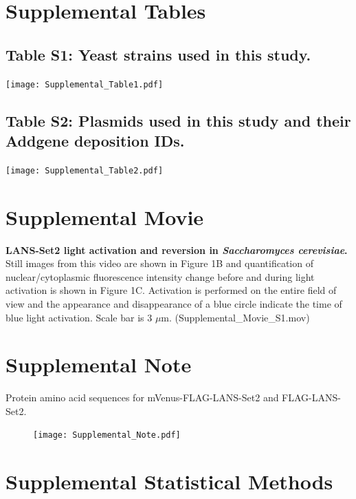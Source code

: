 \documentclass[11pt]{biorxiv}
\begin{document}
\clearpage

\section{Supplemental Tables}
\renewcommand{\thetable}{S\arabic{table}}

\subsection{Table S1: Yeast strains used in this study.}
\begin{table}[ht!]
\center
\texttt{[image: Supplemental\_Table1.pdf]}
\end{table}

\subsection{Table S2: Plasmids used in this study and their Addgene deposition IDs.}
\begin{table}[ht!]
\center
\texttt{[image: Supplemental\_Table2.pdf]}
\end{table}
 
\clearpage

\section{Supplemental Movie}

\noindent \textbf{LANS-Set2 light activation and reversion in \emph{Saccharomyces cerevisiae}.} Still images from this video are shown in Figure 1B and quantification of nuclear/cytoplasmic fluorescence intensity change before and during light activation is shown in Figure 1C. Activation is performed on the entire field of view and the appearance and disappearance of a blue circle indicate the time of blue light activation. Scale bar is 3 $\mu$m. (Supplemental\_Movie\_S1.mov)

\section{Supplemental Note}

Protein amino acid sequences for mVenus-FLAG-LANS-Set2 and FLAG-LANS-Set2.

\begin{figure}[ht!]
\center
\texttt{[image: Supplemental\_Note.pdf]}
\end{figure}

\section{Supplemental Statistical Methods}
\end{document}
